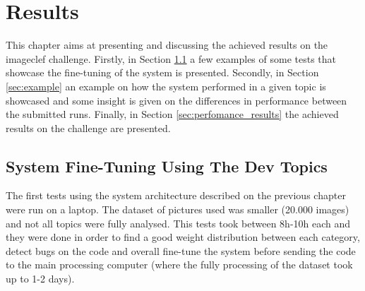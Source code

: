 \cleardoublepage
\chapter{Results}
\label{ch:results}

This chapter aims at presenting and discussing the achieved results on the imageclef challenge. Firstly, in Section \ref{sec:first} a few examples of some tests that showcase the fine-tuning of the system is presented. Secondly, in Section \ref{sec:example} an example on how the system performed in a given topic is showcased and some insight is given on the differences in performance between the submitted runs. Finally, in Section \ref{sec:perfomance_results} the achieved results on the challenge are presented.

\section{System Fine-Tuning Using The Dev Topics}
\label{sec:first}

The first tests using the system architecture described on the previous chapter were run on a laptop. The dataset of pictures used was smaller (20.000 images) and not all topics were fully analysed. This tests took between 8h-10h each and they were done in order to find a good weight distribution between each category, detect bugs on the code and overall fine-tune the system before sending the code to the main processing computer (where the fully processing of the dataset took up to 1-2 days).


